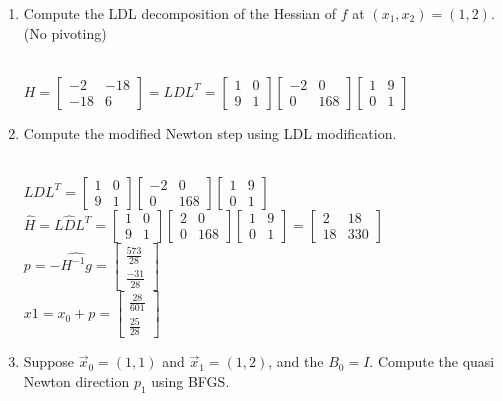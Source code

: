 \documentclass[a4paper,10pt]{article}
\begin{document}
\begin{enumerate}
\begin{enumerate}
{    

}

    \item Compute the LDL decomposition of the Hessian of $f$ at $(x_1,x_2)=(1,2)$. (No pivoting)


{\color{blue} \\
$H=\begin{bmatrix}-2 &-18 \\ -18 & 6\end{bmatrix} = LDL^T = \begin{bmatrix}1 &0 \\ 9 & 1\end{bmatrix} \begin{bmatrix}-2 &0 \\ 0 & 168\end{bmatrix}\begin{bmatrix}1 &9 \\ 0 & 1\end{bmatrix}$\\
}
    \item Compute the modified Newton step using LDL modification.

{\color{blue} \\
$LDL^T = \begin{bmatrix}1 &0 \\ 9 & 1\end{bmatrix} \begin{bmatrix}-2 &0 \\ 0 & 168\end{bmatrix}\begin{bmatrix}1 &9 \\ 0 & 1\end{bmatrix}$\\
$\hat{H} = L\hat{D}L^T = \begin{bmatrix}1 &0 \\ 9 & 1\end{bmatrix} \begin{bmatrix}2 &0 \\ 0 & 168\end{bmatrix}\begin{bmatrix}1 &9 \\ 0 & 1\end{bmatrix} =  \begin{bmatrix}2 &18 \\ 18 & 330\end{bmatrix}$\\
$p = -\hat{H^{-1}g} = \begin{bmatrix} \frac{573}{28} \\ \frac{-31}{28}\end{bmatrix}$\\
$x1 = x_0 + p = \begin{bmatrix}\frac{28}{601} \\ \frac{25}{28}\end{bmatrix}$\\
}
    \item Suppose $\vec{x}_0=(1,1)$ and $\vec{x}_{1}=(1,2)$, and the $B_0=I$. Compute the quasi Newton direction $p_1$ using BFGS.


\end{enumerate}
\end{enumerate}
\end{document}
